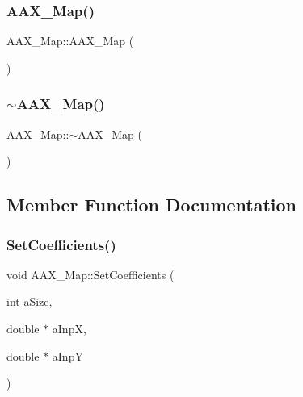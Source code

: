 \subsubsection{\texorpdfstring{AAX\_Map()}{AAX\_Map()}}
{\footnotesize\ttfamily A\+A\+X\+\_\+\+Map\+::\+A\+A\+X\+\_\+\+Map (\begin{DoxyParamCaption}{ }\end{DoxyParamCaption})\hspace{0.3cm}{\ttfamily [inline]}}

\mbox{\label{a01981_a1ebcf52434b45b6e64f5a559efba9bdb}} 
\subsubsection{\texorpdfstring{$\sim$AAX\_Map()}{~AAX\_Map()}}
{\footnotesize\ttfamily A\+A\+X\+\_\+\+Map\+::$\sim$\+A\+A\+X\+\_\+\+Map (\begin{DoxyParamCaption}{ }\end{DoxyParamCaption})\hspace{0.3cm}{\ttfamily [inline]}}



\subsection{Member Function Documentation}
\mbox{\label{a01981_a0023c63be213ba32b1c50eca2301edf7}} 
\subsubsection{\texorpdfstring{SetCoefficients()}{SetCoefficients()}}
{\footnotesize\ttfamily void A\+A\+X\+\_\+\+Map\+::\+Set\+Coefficients (\begin{DoxyParamCaption}\item[{int}]{a\+Size,  }\item[{double $\ast$}]{a\+InpX,  }\item[{double $\ast$}]{a\+InpY }\end{DoxyParamCaption})}

\mbox{\label{a01981_a7776a526306675b9a302efea3941d41a}} 
